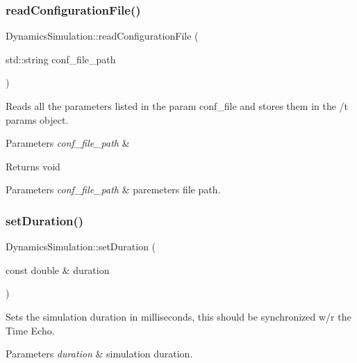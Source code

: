 \subsubsection{\texorpdfstring{read\+Configuration\+File()}{readConfigurationFile()}}
{\footnotesize\ttfamily Dynamics\+Simulation\+::read\+Configuration\+File (\begin{DoxyParamCaption}\item[{std\+::string}]{conf\+\_\+file\+\_\+path }\end{DoxyParamCaption})}



Reads all the parameters listed in the param conf\+\_\+file and stores them in the /t params object. 


\begin{DoxyParams}{Parameters}
{\em conf\+\_\+file\+\_\+path} & \\
\hline
\end{DoxyParams}
\begin{DoxyReturn}{Returns}
void
\end{DoxyReturn}

\begin{DoxyParams}{Parameters}
{\em conf\+\_\+file\+\_\+path} & paremeters file path. \\
\hline
\end{DoxyParams}
\mbox{\label{class_dynamics_simulation_a9148a30590bef5c766fd2366bbd16eb8}} 
\subsubsection{\texorpdfstring{set\+Duration()}{setDuration()}}
{\footnotesize\ttfamily Dynamics\+Simulation\+::set\+Duration (\begin{DoxyParamCaption}\item[{const double \&}]{duration }\end{DoxyParamCaption})}



Sets the simulation duration in milliseconds, this should be synchronized w/r the Time Echo. 


\begin{DoxyParams}{Parameters}
{\em duration} & simulation duration. \\
\hline
\end{DoxyParams}
\mbox{\label{class_dynamics_simulation_a00cf4a6cbde1ef708fdbd58e8d8a7727}} 
